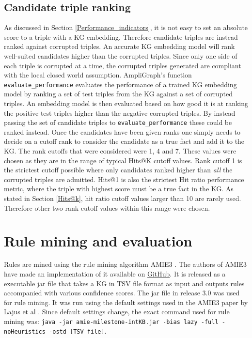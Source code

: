 \subsection{Candidate triple ranking}
As discussed in Section \ref{Performance_indicators}, it is not easy to set an absolute score to a triple with a KG embedding. Therefore candidate triples are instead ranked against corrupted triples. An accurate KG embedding model will rank well-suited candidates higher than the corrupted triples. Since only one side of each triple is corrupted at a time, the corrupted triples generated are compliant with the local closed world assumption. AmpliGraph's function \texttt{evaluate\_performance} evaluates the performance of a trained KG embedding model by ranking a set of test triples from the KG against a set of corrupted triples. An embedding model is then evaluated based on how good it is at ranking the positive test triples higher than the negative corrupted triples. By instead passing the set of candidate triples to \texttt{evaluate\_performance} these could be ranked instead. Once the candidates have been given ranks one simply needs to decide on a cutoff rank to consider the candidate as a true fact and add it to the KG. The rank cutoffs that were considered were 1, 4 and 7. These values were chosen as they are in the range of typical Hits@K cutoff values. Rank cutoff 1 is the strictest cutoff possible where only candidates ranked higher than \textit{all} the corrupted triples are admitted. Hits@1 is also the strictest Hit ratio performance metric, where the triple with highest score must be a true fact in the KG. As stated in Section \ref{Hits@k}, hit ratio cutoff values larger than 10 are rarely used. Therefore other two rank cutoff values within this range were chosen.

\section{Rule mining and evaluation}
Rules are mined using the rule mining algorithm AMIE3 \cite{amie3}. The authors of AMIE3 have made an implementation of it available on \hyperlink{https://github.com/lajus/amie}{GitHub}. It is released as a executable jar file that takes a KG in TSV file format as input and outputs rules accompanied with various confidence scores. The jar file in release 3.0 was used for rule mining. It was run using the default settings used in the AMIE3 paper by Lajus et al \cite{amie3}. Since default settings change, the exact command used for rule mining was: \texttt{java -jar amie-milestone-intKB.jar -bias lazy -full -noHeuristics -ostd [TSV file]}.

